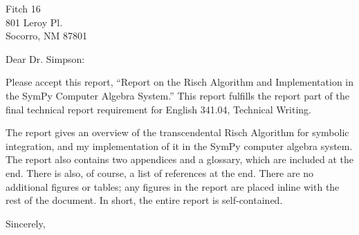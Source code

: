 \documentclass{letter}
\begin{document}
\begin{letter}{Fitch 16\\
801 Leroy Pl.\\
Socorro, NM 87801
}
\opening{Dear Dr. Simpson:}

Please accept this report, ``Report  on the Risch Algorithm and
Implementation in the SymPy Computer Algebra System.''  This report
fulfills the report part of the final technical report requirement for
English 341.04, Technical Writing.

The report gives an overview of the transcendental Risch Algorithm for
symbolic integration, and my implementation of it in the SymPy computer
algebra system.  The report also contains two appendices and a glossary,
which are included at the end.  There is also, of course, a list of
references at the end.  There are no additional figures or tables; any
figures in the report are placed inline with the rest of the document.
In short, the entire report is self-contained.

\closing{Sincerely,}
\end{letter}
\end{document}
